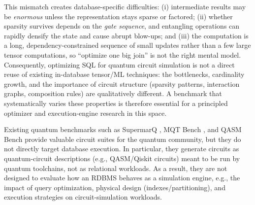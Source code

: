 This mismatch creates database-specific difficulties:
(i) intermediate results may be \emph{enormous} unless the representation stays sparse or factored;
(ii) whether sparsity survives depends on the \emph{gate sequence}, and entangling operations can rapidly densify the state and
cause abrupt blow-ups;
and (iii) the computation is a long, dependency-constrained sequence of small updates rather than a few large tensor computations,
so ``optimize one big join'' is not the right mental model. Consequently, optimizing SQL for quantum circuit simulation is not a
direct reuse of existing in-database tensor/ML techniques: the bottlenecks, cardinality growth, and the importance of
circuit structure (sparsity patterns, interaction graphs, composition rules) are qualitatively different.
A benchmark that systematically varies these properties is therefore essential for a principled optimizer and execution-engine
research in this space.

\medskip
{}
Existing quantum benchmarks such as SupermarQ \cite{tomesh2022supermarqscalablequantumbenchmark}, MQT Bench \cite{Quetschlich_2023}, and QASM Bench \cite{li2022qasmbenchlowlevelqasmbenchmark} provide valuable circuit suites for the quantum community, but they do not directly target database execution.
In particular, they generate circuits as quantum-circuit descriptions (e.g., QASM/Qiskit circuits) meant to be run by quantum toolchains, not as relational workloads. As a result, they are not designed to evaluate how an RDBMS behaves as a simulation engine, e.g., the impact of query optimization, physical design (indexes/partitioning), and execution strategies on circuit-simulation workloads. 

